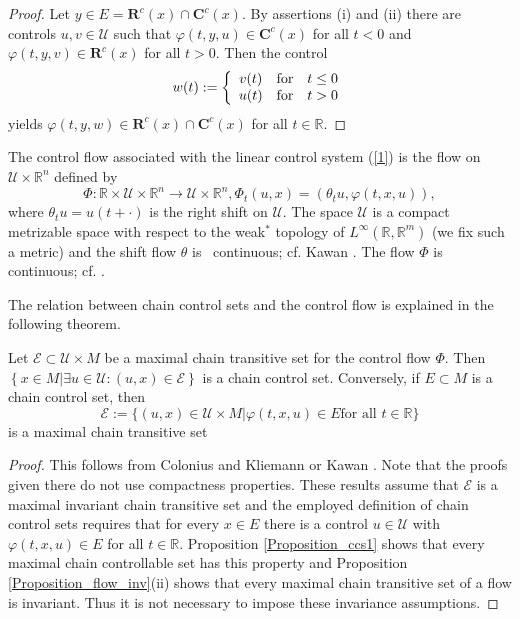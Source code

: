 \documentclass{siamltex}%
\begin{document}
\begin{proof}
Let $y\in E=\mathbf{R}^{c}(x)\cap\mathbf{C}^{c}(x)$. By assertions (i) and
(ii) there are controls $u,v\in\mathcal{U}$ such that $\varphi(t,y,u)\in
\mathbf{C}^{c}(x)$ for all $t<0$ and $\varphi(t,y,v)\in\mathbf{R}^{c}(x)$ for
all $t>0$. Then the control
\[
w(t):=\left\{
\begin{array}
[c]{ccc}%
v(t) & \text{for} & t\leq0\\
u(t) & \text{for} & t>0
\end{array}
\right.
\]
yields $\varphi(t,y,w)\in\mathbf{R}^{c}(x)\cap\mathbf{C}^{c}(x)$ for all
$t\in\mathbb{R}$.
\end{proof}

The control flow associated with the linear control system (\ref{1}) is the
flow on $\mathcal{U}\times\mathbb{R}^{n}$ defined by%
\begin{equation}
\Phi:\mathbb{R}\times\mathcal{U}\times\mathbb{R}^{n}\rightarrow\mathcal{U}%
\times\mathbb{R}^{n},\Phi_{t}(u,x)=(\theta_{t}u,\varphi(t,x,u)),
\label{control_flow}%
\end{equation}
where $\theta_{t}u=u(t+\cdot)$ is the right shift on $\mathcal{U}$. The space
$\mathcal{U}$ is a compact metrizable space with respect to the weak$^{\ast}$
topology of $L^{\infty}(\mathbb{R},\mathbb{R}^{m})$ (we fix such a metric) and
the shift flow $\theta$ is \ continuous; cf. Kawan \cite[Proposition
1.15]{Kawan13}. The flow $\Phi$ is continuous; cf. \cite[Proposition
1.17]{Kawan13}.

The relation between chain control sets and the control flow is explained in
the following theorem.

\begin{theorem}
\label{Theorem_equivalence}Let $\mathcal{E}\subset\mathcal{U}\times M$ be a
maximal chain transitive set for the control flow $\Phi$. Then $\left\{  x\in
M\left\vert \exists u\in\mathcal{U}:(u,x)\in\mathcal{E}\right.  \right\}  $ is
a chain control set. Conversely, if $E\subset M$ is a chain control set, then%
\begin{equation}
\mathcal{E}:=\{(u,x)\in\mathcal{U}\times M\left\vert \varphi(t,x,u)\in E\text{
for all }t\in\mathbb{R}\right.  \} \label{lift_E}%
\end{equation}
is a maximal chain transitive set
\end{theorem}

\begin{proof}
This follows from Colonius and Kliemann \cite[Theorem 4.3.11]{ColK00} or Kawan
\cite[Proposition 1.24(iv)]{Kawan13}. Note that the proofs given there do not
use compactness properties. These results assume that $\mathcal{E}$ is a
maximal invariant chain transitive set and the employed definition of chain
control sets requires that for every $x\in E$ there is a control
$u\in\mathcal{U}$ with $\varphi(t,x,u)\in E$ for all $t\in\mathbb{R}$.
Proposition \ref{Proposition_ccs1} shows that every maximal chain controllable
set has this property and Proposition \ref{Proposition_flow_inv}(ii) shows
that every maximal chain transitive set of a flow is invariant. Thus it is not
necessary to impose these invariance assumptions.
\end{proof}
\end{document}
